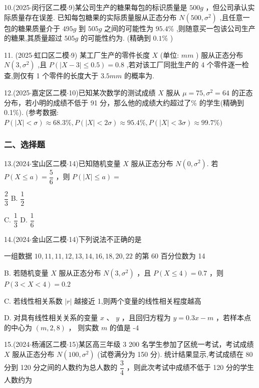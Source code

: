 10.(2025$\cdot$闵行区二模$\cdot$9)某公司生产的糖果每包的标识质量是 ${500}{g}$ ，但公司承认实际质量存在误差. 已知每包糖果的实际质量服从正态分布 $N\left( {{500},{\sigma }^{2}}\right)$ ,且任意一包的糖果质量介于 ${495}{g}$ 到 ${505}{g}$ 之间的可能性为 ${95.4}\%$ ,则随意买一包该公司生产的糖果,其质量超过 ${505}{g}$ 的可能性约为\blkda[2]{}. (精确到 ${0.1}\%$ )

11. (2025$\cdot$虹口区二模$\cdot$9) 某工厂生产的零件长度 $X$ (单位: ${{mm}}$ ) 服从正态分布 $N\left( {3,{\sigma }^{2}}\right)$ ,且 $P\left( {\left| {X - 3}\right|  \leq  {0.5}}\right)  = {0.8}$ ,若对该工厂同批生产的 4 个零件逐一检查,则仅有 1 个零件的长度大于 ${3.5}{{mm}}$ 的概率为\blkda[2]{}.

12.(2025$\cdot$嘉定区二模$\cdot$10)已知某次数学的测试成绩 $X$ 服从 $\mu  = {75},{\sigma }^{2} = {64}$ 的正态分布，若小明的成绩不低于 91 分，那么他的成绩大约超过了\blkda[2]{}\% 的学生(精确到 0.1\%). (参考数据: $P\left( {\left| X\right|  < \sigma }\right)  \approx  {68.3}\% ,P\left( {\left| X\right|  < {2\sigma }}\right)  \approx  {95.4}\% ,P\left( {\left| X\right|  < {3\sigma }}\right)  \approx  {99.7}\% )$

\subsubsection*{二、选择题}

13.(2024$\cdot$宝山区二模$\cdot$14)已知随机变量 $X$ 服从正态分布 $N\left( {0,{\sigma }^{2}}\right)$. 若 $P\left( {X \leq  a}\right)  = \dfrac{5}{6}$ ，则 $P\left( {\left| X\right|  \leq  a}\right)  =$ \dotfill{(\kh{})}

\xx{}{}{}{}$\dfrac{2}{3}$ B. $\dfrac{1}{2}$

C. $\dfrac{1}{3}$ D. $\dfrac{1}{6}$

14.(2024$\cdot$金山区二模$\cdot$14)下列说法不正确的是 \dotfill{(\kh{})}

\xx{}{}{}{}一组数据 ${10},{11},{11},{12},{13},{14},{16},{18},{20},{22}$ 的第 60 百分位数为 14

B. 若随机变量 $X$ 服从正态分布 $N\left( {3,{\sigma }^{2}}\right)$ ，且 $P\left( {X \leq  4}\right)  = {0.7}$ ，则 $P\left( {3 < X < 4}\right)  = {0.2}$

C. 若线性相关系数 $\left| r\right|$ 越接近 1,则两个变量的线性相关程度越高

D. 对具有线性相关关系的变量 $x$ 、 $y$ ，且回归方程为 $y = {0.3x} - m$ ，若样本点的中心为 $\left( {m,2,8}\right)$ ， 则实数 $m$ 的值是 -4

15.(2024$\cdot$杨浦区二模$\cdot$15)某区高三年级 3 200 名学生参加了区统一考试，考试成绩 $X$ 服从正态分布 $N\left( {{100},{\sigma }^{2}}\right)$ (试卷满分为 150 分). 统计结果显示,考试成绩在 80 分到 120 分之间的人数约为总人数的 $\dfrac{3}{4}$ ，则此次考试中成绩不低于 120 分的学生人数约为 \dotfill{(\kh{})}

